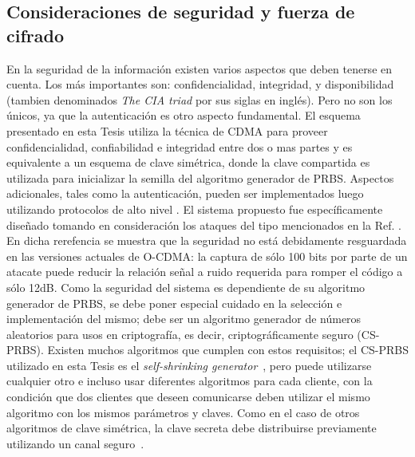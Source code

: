 \subsection{Consideraciones de seguridad y fuerza de cifrado}\label{Seguridad-fuerza}
En la seguridad de la información existen varios aspectos que deben tenerse en cuenta. Los más importantes son: confidencialidad, integridad, y disponibilidad (tambien denominados \textit{The CIA triad} \cite{greene2006security} por sus siglas en inglés). Pero no son los únicos, ya que la autenticación es otro aspecto fundamental.
El esquema presentado en esta Tesis utiliza la técnica de CDMA para proveer confidencialidad, confiabilidad e integridad entre dos o mas partes y es equivalente a un esquema de clave simétrica, donde la clave compartida es utilizada para inicializar la semilla del algoritmo generador de PRBS. Aspectos adicionales, tales como la autenticación, pueden ser implementados luego utilizando protocolos de alto nivel \cite{krawczyk2001order}.
El sistema propuesto fue específicamente diseñado tomando en consideración los ataques del tipo mencionados en la Ref. \cite{Shake:05}. En dicha rerefencia se muestra que la seguridad no está debidamente resguardada en las versiones actuales de O-CDMA: la captura de sólo 100 bits por parte de un atacate puede reducir la relación señal a ruido requerida para romper el código a sólo 12dB.
Como la seguridad del sistema es dependiente de su algoritmo generador de PRBS, se debe poner especial cuidado en la selección e implementación del mismo; debe ser un algoritmo generador de números aleatorios para usos en criptografía, es decir, criptográficamente seguro (CS-PRBS). Existen muchos algoritmos que cumplen con estos requisitos; el CS-PRBS utilizado en esta Tesis es el \textit{self-shrinking generator}~\cite{Meier:94}, pero puede utilizarse cualquier otro e incluso usar diferentes algoritmos para cada cliente, con la condición que dos clientes que deseen comunicarse deben utilizar el mismo algoritmo con los mismos parámetros y claves.
Como en el caso de otros algoritmos de clave simétrica, la clave secreta debe distribuirse previamente utilizando un canal seguro~\cite{Menezes:1996:HAC:548089}.

